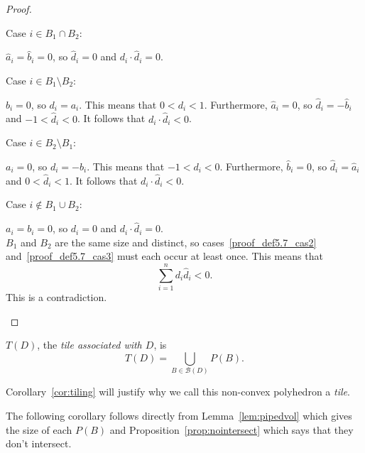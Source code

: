 \documentclass[ALCO,ThmDefs,Unicode,epreuves]{cedram}
\newcommand{\B}{\mathcal{B}}
\begin{document}
\begin{proof}
\begin{enonce}[remark]{Case}\label{proof_def5.7_cas1} $i \in B_1 \cap B_2$:

$\widehat a_i = \widehat b_i = 0$, so $\widehat d_i = 0$ and $d_i \cdot \widehat d_i = 0$. 
\end{enonce}

\begin{enonce}[remark]{Case}\label{proof_def5.7_cas2} $i \in B_1 \setminus B_2$:

$b_i = 0$, so $d_i = a_i$. This means that $0 < d_i < 1$. Furthermore, $\widehat a_i = 0$, so $\widehat d_i = -\widehat b_i$ and $-1 < \widehat d_i < 0$. It follows that $d_i \cdot \widehat d_i < 0$.
\end{enonce}

\begin{enonce}[remark]{Case}\label{proof_def5.7_cas3} $i \in B_2 \setminus B_1$:

$a_i = 0$, so $d_i = -b_i$. This means that $-1 < d_i < 0$. Furthermore, $\widehat b_i = 0$, so $\widehat d_i = \widehat a_i$ and $0 < \widehat d_i < 1$. It follows that $d_i \cdot \widehat d_i < 0$.
\end{enonce}

\begin{enonce}[remark]{Case}\label{proof_def5.7_cas4} $i \not\in B_1 \cup B_2$:

$ a_i = b_i = 0$, so $d_i = 0$ and $d_i \cdot \widehat d_i = 0$.\\

$B_1$ and $B_2$ are the same size and distinct, so cases~\ref{proof_def5.7_cas2} and~\ref{proof_def5.7_cas3} must each occur at least once. This means that
\[
\sum_{i=1}^{n} d_i\widehat d_i < 0.
\]
This is a contradiction.\qedhere
\end{enonce}
\endgroup
\setcounter{cdrthm}{7}
\end{proof}

\begin{defi}
$T(D)$, the \emph{tile associated with $D$}, is 
\[
T(D) = \bigcup_{B \in \B(D)} P(B).
\]
\end{defi}

Corollary~\ref{cor:tiling} will justify why we call this non-convex polyhedron a \emph{tile}. 

The following corollary follows directly from Lemma~\ref{lem:pipedvol} which gives the size of each $P(B)$ and Proposition~\ref{prop:nointersect} which says that they don't intersect.
\end{document}
